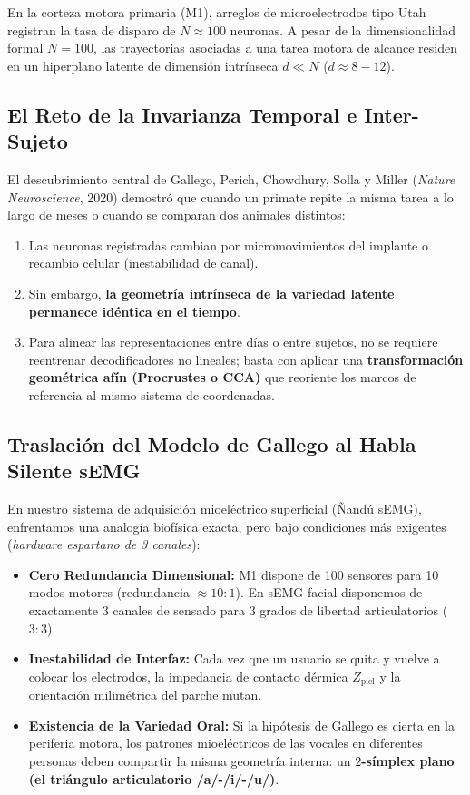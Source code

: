 \documentclass[11pt,a4paper,openany]{book}
\theoremstyle{definition}
\begin{document}
En la corteza motora primaria (M1), arreglos de microelectrodos tipo Utah registran la tasa de disparo de $N \approx 100$ neuronas. A pesar de la dimensionalidad formal $N = 100$, las trayectorias asociadas a una tarea motora de alcance residen en un hiperplano latente de dimensión intrínseca $d \ll N$ ($d \approx 8 - 12$).

\subsection{El Reto de la Invarianza Temporal e Inter-Sujeto}
El descubrimiento central de Gallego, Perich, Chowdhury, Solla y Miller (\textit{Nature Neuroscience}, 2020) demostró que cuando un primate repite la misma tarea a lo largo de meses o cuando se comparan dos animales distintos:
\begin{enumerate}
    \item Las neuronas registradas cambian por micromovimientos del implante o recambio celular (inestabilidad de canal).
    \item Sin embargo, \textbf{la geometría intrínseca de la variedad latente permanece idéntica en el tiempo}.
    \item Para alinear las representaciones entre días o entre sujetos, no se requiere reentrenar decodificadores no lineales; basta con aplicar una \textbf{transformación geométrica afín (Procrustes o CCA)} que reoriente los marcos de referencia al mismo sistema de coordenadas.
\end{enumerate}

\subsection{Traslación del Modelo de Gallego al Habla Silente sEMG}
En nuestro sistema de adquisición mioeléctrico superficial (Ñandú sEMG), enfrentamos una analogía biofísica exacta, pero bajo condiciones más exigentes (\textit{hardware espartano de 3 canales}):
\begin{itemize}
    \item \textbf{Cero Redundancia Dimensional:} M1 dispone de 100 sensores para 10 modos motores (redundancia $\approx 10:1$). En sEMG facial disponemos de exactamente $3$ canales de sensado para $3$ grados de libertad articulatorios ($3:3$).
    \item \textbf{Inestabilidad de Interfaz:} Cada vez que un usuario se quita y vuelve a colocar los electrodos, la impedancia de contacto dérmica $Z_{\text{piel}}$ y la orientación milimétrica del parche mutan.
    \item \textbf{Existencia de la Variedad Oral:} Si la hipótesis de Gallego es cierta en la periferia motora, los patrones mioeléctricos de las vocales en diferentes personas deben compartir la misma geometría interna: un \textbf{$2$-símplex plano (el triángulo articulatorio /a/-/i/-/u/)}.
\end{itemize}
\end{document}
